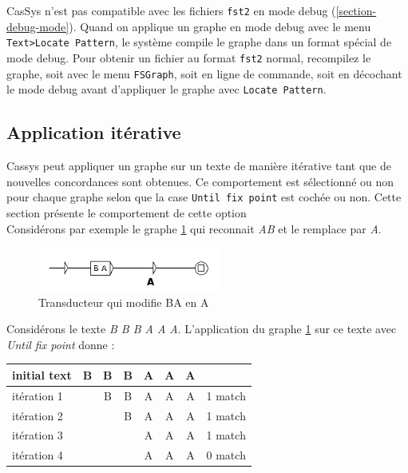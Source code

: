 \bigskip
\noindent CasSys n'est pas compatible avec les fichiers \verb+fst2+ en mode debug (\ref{section-debug-mode}).
Quand on applique un graphe en mode debug avec le menu \verb+Text>Locate Pattern+, le système
compile le graphe dans un format spécial de mode debug. Pour obtenir un fichier au format \verb+fst2+ normal,
recompilez le graphe, soit avec le menu \verb+FSGraph+, soit en ligne de commande, soit en décochant le mode
debug avant d'appliquer le graphe avec \verb+Locate Pattern+.

\subsection{Application itérative}
\label{sub:AppWhiCon}

Cassys peut appliquer un graphe sur un texte de manière itérative tant que de nouvelles concordances sont obtenues.
Ce comportement est sélectionné ou non pour chaque graphe selon que la case \verb+Until fix point+ est cochée ou non. Cette section présente le comportement de cette option\\

Considérons par exemple le graphe \ref{fig:AB->A} qui reconnait \emph{AB} et le remplace par \emph{A}.\\

\begin{figure}[!htbp]
  \centering
  \includegraphics[width=6cm]{resources/img/AB_to_A.png}
  \caption{Transducteur qui modifie BA en A}
  \label{fig:AB->A}
\end{figure}

Considérons le texte \emph{B B B A A A}. L'application du graphe \ref{fig:AB->A} sur ce texte avec \emph{Until fix point}  donne :\\

\begin{tabular}{|l|cccccc|r|}
\hline
initial text  &B&B&B&A&A&A&\\
\hline
itération 1 & &B&B&A&A&A& 1 match\\
itération 2 & & &B&A&A&A& 1 match\\
itération 3 & & & &A&A&A& 1 match\\
itération 4 & & & &A&A&A& 0 match\\
\hline
\end{tabular}

